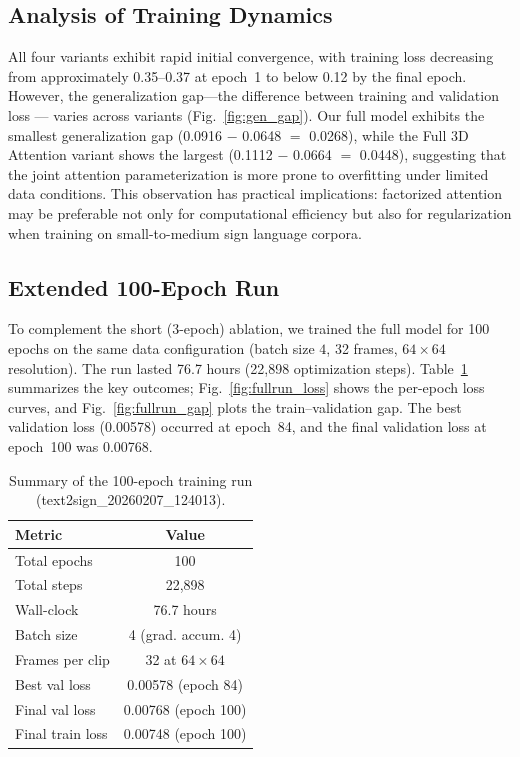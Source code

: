 \documentclass{ieeeaccess}
\begin{document}
\subsection{Analysis of Training Dynamics}

All four variants exhibit rapid initial convergence, with training loss decreasing from approximately 0.35--0.37 at epoch~1 to below 0.12 by the final epoch. However, the generalization gap—the difference between training and validation loss — varies across variants (Fig.~\ref{fig:gen_gap}). Our full model exhibits the smallest generalization gap (0.0916 $-$ 0.0648 $=$ 0.0268), while the Full 3D Attention variant shows the largest (0.1112 $-$ 0.0664 $=$ 0.0448), suggesting that the joint attention parameterization is more prone to overfitting under limited data conditions. This observation has practical implications: factorized attention may be preferable not only for computational efficiency but also for regularization when training on small-to-medium sign language corpora.

\subsection{Extended 100-Epoch Run}

To complement the short (3-epoch) ablation, we trained the full model for 100 epochs on the same data configuration (batch size $4$, 32 frames, $64\times64$ resolution). The run lasted 76.7 hours (22{,}898 optimization steps). Table~\ref{tab:full_run_summary} summarizes the key outcomes; Fig.~\ref{fig:fullrun_loss} shows the per-epoch loss curves, and Fig.~\ref{fig:fullrun_gap} plots the train--validation gap. The best validation loss (0.00578) occurred at epoch~84, and the final validation loss at epoch~100 was 0.00768.

\begin{table}[H]
    \centering
    \caption{Summary of the 100-epoch training run (text2sign\_20260207\_124013).}
    \label{tab:full_run_summary}
    \renewcommand{\arraystretch}{1.15}
    \begin{tabular}{@{} l c @{} }
        \toprule
        \rowcolor{tableheader}
        \textbf{Metric} & \textbf{Value} \\
        \midrule
        \rowcolor{tablerow1} Total epochs & 100 \\
        \rowcolor{tablerow2} Total steps & 22{,}898 \\
        \rowcolor{tablerow1} Wall-clock & 76.7 hours \\
        \rowcolor{tablerow2} Batch size & 4 (grad. accum. 4) \\
        \rowcolor{tablerow1} Frames per clip & 32 at $64\times64$ \\
        \rowcolor{tablerow2} Best val loss & 0.00578 (epoch 84) \\
        \rowcolor{tablerow1} Final val loss & 0.00768 (epoch 100) \\
        \rowcolor{tablerow2} Final train loss & 0.00748 (epoch 100) \\
        \bottomrule
    \end{tabular}
\end{table}
\end{document}
